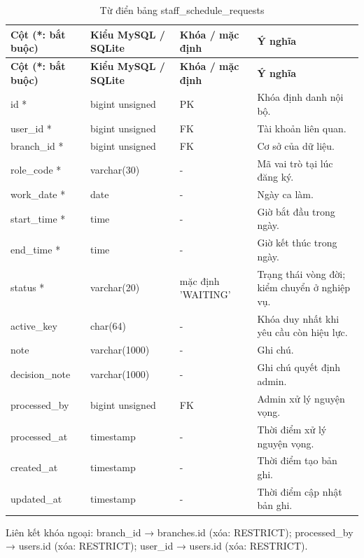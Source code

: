 {\fontsize{10}{12}\selectfont\setlength{\tabcolsep}{3pt}\renewcommand{\arraystretch}{1.12}
\begin{longtable}{@{}L{\textwidth-4.86pt\relax} L{\textwidth-3.96pt\relax} L{\textwidth-2.88pt\relax} L{\textwidth-6.3pt\relax}@{}}
\caption{Từ điển bảng staff\_\allowbreak{}schedule\_\allowbreak{}requests}\\
\toprule
\textbf{Cột (*:\allowbreak{} bắt buộc)} & \textbf{Kiểu My\allowbreak{}SQL /\allowbreak{} SQLite} & \textbf{Khóa /\allowbreak{} mặc định} & \textbf{Ý nghĩa}\\\midrule
\endfirsthead
\toprule
\textbf{Cột (*:\allowbreak{} bắt buộc)} & \textbf{Kiểu My\allowbreak{}SQL /\allowbreak{} SQLite} & \textbf{Khóa /\allowbreak{} mặc định} & \textbf{Ý nghĩa}\\\midrule
\endhead
\bottomrule\endlastfoot
id * & bigint unsigned & PK & Khóa định danh nội bộ.\allowbreak{}\\[1pt]
user\_\allowbreak{}id * & bigint unsigned & FK & Tài khoản liên quan.\allowbreak{}\\[1pt]
branch\_\allowbreak{}id * & bigint unsigned & FK & Cơ sở của dữ liệu.\allowbreak{}\\[1pt]
role\_\allowbreak{}code * & varchar(30) & - & Mã vai trò tại lúc đăng ký.\allowbreak{}\\[1pt]
work\_\allowbreak{}date * & date & - & Ngày ca làm.\allowbreak{}\\[1pt]
start\_\allowbreak{}time * & time & - & Giờ bắt đầu trong ngày.\allowbreak{}\\[1pt]
end\_\allowbreak{}time * & time & - & Giờ kết thúc trong ngày.\allowbreak{}\\[1pt]
status * & varchar(20) & mặc định 'WAITING' & Trạng thái vòng đời; kiểm chuyển ở nghiệp vụ.\allowbreak{}\\[1pt]
active\_\allowbreak{}key & char(64) & - & Khóa duy nhất khi yêu cầu còn hiệu lực.\allowbreak{}\\[1pt]
note & varchar(1000) & - & Ghi chú.\allowbreak{}\\[1pt]
decision\_\allowbreak{}note & varchar(1000) & - & Ghi chú quyết định admin.\allowbreak{}\\[1pt]
processed\_\allowbreak{}by & bigint unsigned & FK & Admin xử lý nguyện vọng.\allowbreak{}\\[1pt]
processed\_\allowbreak{}at & timestamp & - & Thời điểm xử lý nguyện vọng.\allowbreak{}\\[1pt]
created\_\allowbreak{}at & timestamp & - & Thời điểm tạo bản ghi.\allowbreak{}\\[1pt]
updated\_\allowbreak{}at & timestamp & - & Thời điểm cập nhật bản ghi.\allowbreak{}\\[1pt]
\end{longtable}}
Liên kết khóa ngoại:\allowbreak{} branch\_\allowbreak{}id → branches.\allowbreak{}id (xóa:\allowbreak{} RESTRICT); processed\_\allowbreak{}by → users.\allowbreak{}id (xóa:\allowbreak{} RESTRICT); user\_\allowbreak{}id → users.\allowbreak{}id (xóa:\allowbreak{} RESTRICT).\allowbreak{}

